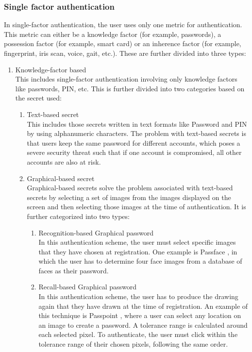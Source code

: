 \documentclass[10pt,journal,compsoc]{IEEEtran}
\begin{document}
 \subsubsection{Single factor authentication}
      In single-factor authentication, the user uses only one metric for authentication. This metric can either be a knowledge factor (for example, passwords), a possession factor (for example, smart card) or an inherence factor (for example, fingerprint, iris scan, voice, gait, etc.). These are further divided into three types:\\
      \begin{enumerate}
          \item Knowledge-factor based\\
         This includes single-factor authentication involving only knowledge factors like passwords, PIN, etc. This is further divided into two categories based on the secret used:
          \begin{enumerate}
              \item Text-based secret\\
              This includes those secrets written in text formats like Password and PIN by using alphanumeric characters. The problem with text-based secrets is that users keep the same password for different accounts, which poses a severe security threat such that if one account is compromised, all other accounts are also at risk.
              \item Graphical-based secret\\
              Graphical-based secrets solve the problem associated with text-based secrets by selecting a set of images from the images displayed on the screen and then selecting those images at the time of authentication. It is further categorized into two types:
              \begin{enumerate}
                  \item Recognition-based Graphical password\\
                  In this authentication scheme, the user must select specific images that they have chosen at registration. One example is Passface \cite{IEEEtran61}, in which the user has to determine four face images from a database of faces as their password.
                  \item Recall-based Graphical password\\
                 In this authentication scheme, the user has to produce the drawing again that they have drawn at the time of registration. An example of this technique is Passpoint \cite{IEEEtran60}, where a user can select any location on an image to create a password. A tolerance range is calculated around each selected pixel. To authenticate, the user must click within the tolerance range of their chosen pixels, following the same order.
              \end{enumerate}
              

\end{enumerate}
\end{enumerate}
\end{document}
